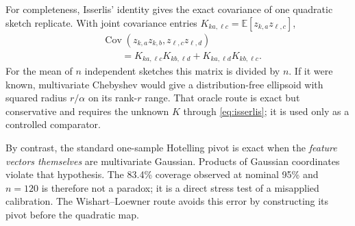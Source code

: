 \documentclass[11pt]{article}
\begin{document}
For completeness, Isserlis' identity gives the exact covariance of one
quadratic sketch replicate.  With joint covariance entries
$K_{ka,\ell c}=\mathbb E[z_{k,a}z_{\ell,c}]$,
\begin{align}
 &\operatorname{Cov}(z_{k,a}z_{k,b},z_{\ell,c}z_{\ell,d})\\
 &\qquad=K_{ka,\ell c}K_{kb,\ell d}
          +K_{ka,\ell d}K_{kb,\ell c}.
 \label{eq:isserlis}
\end{align}
For the mean of $n$ independent sketches this matrix is divided by $n$.
If it were known, multivariate Chebyshev would give a distribution-free
ellipsoid with squared radius $r/\alpha$ on its rank-$r$ range.  That oracle
route is exact but conservative and requires the unknown $K$ through
\eqref{eq:isserlis}; it is used only as a controlled comparator.

By contrast, the standard one-sample Hotelling pivot is exact when the
\emph{feature vectors themselves} are multivariate Gaussian.  Products of
Gaussian coordinates violate that hypothesis.  The 83.4\% coverage observed
at nominal 95\% and $n=120$ is therefore not a paradox; it is a direct stress
test of a misapplied calibration.  The Wishart--Loewner route avoids this error
by constructing its pivot before the quadratic map.



\end{document}

